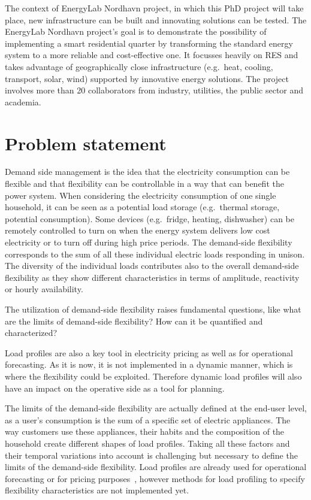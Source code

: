 \documentclass[fleqn,a4paper,twoside,10pt]{article}
\begin{document}
	The context of EnergyLab Nordhavn project, in which this PhD project will take place, new infrastructure can be built and innovating solutions can be tested. The EnergyLab Nordhavn project's goal is to demonstrate the possibility of implementing a smart residential quarter by transforming the standard energy system to a more reliable and cost-effective one. It focusses heavily on RES and takes advantage of geographically close infrastructure (e.g.\ heat, cooling, transport, solar, wind) supported by innovative energy solutions. The project involves more than 20 collaborators from industry, utilities, the public sector and academia.

\section{Problem statement}
	Demand side management is the idea that the electricity consumption can be flexible and that flexibility can be controllable in a way that can benefit the power system. When considering the electricity consumption of one single household, it can be seen as a potential load storage (e.g.\ thermal storage, potential consumption). Some devices (e.g.\ fridge, heating, dishwasher) can be remotely controlled to turn on when the energy system delivers low cost electricity or to turn off during high price periods. The demand-side flexibility corresponds to the sum of all these individual electric loads responding in unison. The diversity of the individual loads contributes also to the overall demand-side flexibility as they show different characteristics in terms of amplitude, reactivity or hourly availability.
	
	The utilization of demand-side flexibility raises fundamental questions, like what are the limits of demand-side flexibility? How can it be quantified and characterized? 

	Load profiles are also a key tool in electricity pricing as well as for operational forecasting. As it is now, it is not implemented in a dynamic manner, which is where the flexibility could be exploited. Therefore dynamic load profiles will also have an impact on the operative side as a tool for planning.
	
	The limits of the demand-side flexibility are actually defined at the end-user level, as a user's consumption is the sum of a specific set of electric appliances. The way customers use these appliances, their habits and the composition of the household create different shapes of load profiles. Taking all these factors and their temporal variations into account is challenging but necessary to define the limits of the demand-side flexibility. Load profiles are already used for operational forecasting or for pricing purposes~\cite{Ramos2013,figueiredo2005,kitayama2002}, however methods for load profiling to specify flexibility characteristics are not implemented yet.
\end{document}
